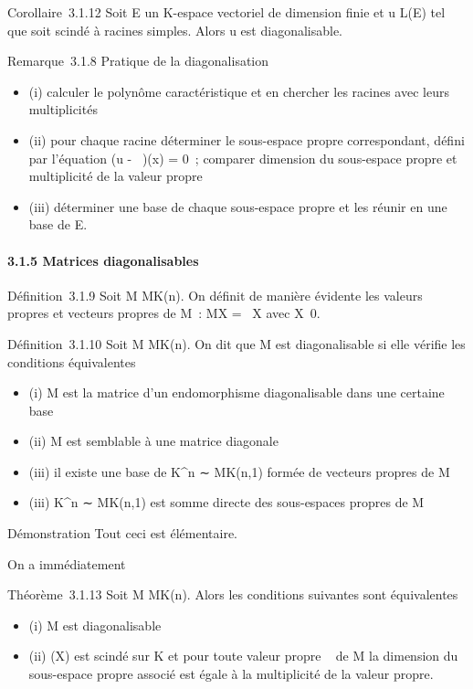 Corollaire~3.1.12 Soit E un K-espace vectoriel de dimension finie et u \in
L(E) tel que \chiu soit scindé à racines simples. Alors u est
diagonalisable.

Remarque~3.1.8 Pratique de la diagonalisation

\begin{itemize}
\itemsep1pt\parskip0pt
\item
  (i) calculer le polynôme caractéristique et en chercher les racines
  avec leurs multiplicités
\item
  (ii) pour chaque racine déterminer le sous-espace propre
  correspondant, défini par l'équation (u -
  \lambda~\mathrmId)(x) = 0~; comparer dimension du
  sous-espace propre et multiplicité de la valeur propre
\item
  (iii) déterminer une base de chaque sous-espace propre et les réunir
  en une base de E.
\end{itemize}

\paragraph{3.1.5 Matrices diagonalisables}

Définition~3.1.9 Soit M \in MK(n). On définit de manière
évidente les valeurs propres et vecteurs propres de M~: MX = \lambda~X avec
X\neq~0.

Définition~3.1.10 Soit M \in MK(n). On dit que M est
diagonalisable si elle vérifie les conditions équivalentes

\begin{itemize}
\itemsep1pt\parskip0pt
\item
  (i) M est la matrice d'un endomorphisme diagonalisable dans une
  certaine base
\item
  (ii) M est semblable à une matrice diagonale
\item
  (iii) il existe une base de K^n ∼ MK(n,1) formée
  de vecteurs propres de M
\item
  (iii) K^n ∼ MK(n,1) est somme directe des
  sous-espaces propres de M
\end{itemize}

Démonstration Tout ceci est élémentaire.

On a immédiatement

Théorème~3.1.13 Soit M \in MK(n). Alors les conditions suivantes
sont équivalentes

\begin{itemize}
\itemsep1pt\parskip0pt
\item
  (i) M est diagonalisable
\item
  (ii) \chiM(X) est scindé sur K et pour toute valeur propre \lambda~ de
  M la dimension du sous-espace propre associé est égale à la
  multiplicité de la valeur propre.
\end{itemize}

